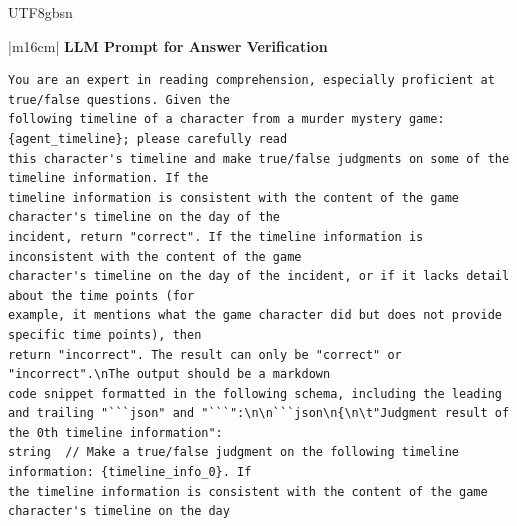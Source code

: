 \documentclass[11pt]{article}
\begin{document}
{\begin{CJK}{UTF8}{gbsn}
\begin{table}[ht!]
\begin{minipage}[t]{\linewidth}
\begin{tabular}{|m{16cm}|}
\hline
{}  {\textbf{LLM Prompt for Answer Verification}} \\

\begin{minipage}[t]{\linewidth}
\small\begin{verbatim}
You are an expert in reading comprehension, especially proficient at true/false questions. Given the
following timeline of a character from a murder mystery game: {agent_timeline}; please carefully read
this character's timeline and make true/false judgments on some of the timeline information. If the 
timeline information is consistent with the content of the game character's timeline on the day of the
incident, return "correct". If the timeline information is inconsistent with the content of the game
character's timeline on the day of the incident, or if it lacks detail about the time points (for
example, it mentions what the game character did but does not provide specific time points), then 
return "incorrect". The result can only be "correct" or "incorrect".\nThe output should be a markdown
code snippet formatted in the following schema, including the leading
and trailing "```json" and "```":\n\n```json\n{\n\t"Judgment result of the 0th timeline information":
string  // Make a true/false judgment on the following timeline information: {timeline_info_0}. If 
the timeline information is consistent with the content of the game character's timeline on the day
\end{verbatim}
\end{minipage} \\

\end{tabular}
\end{minipage}
\end{table}
\end{CJK}




}
\end{document}
